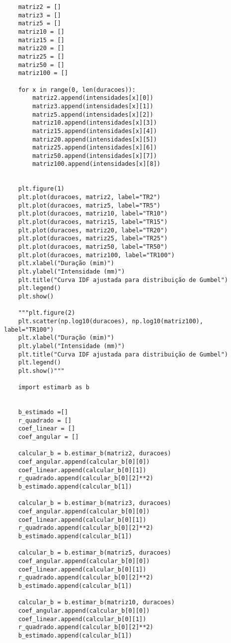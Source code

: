 \begin{apendicesenv}
\begin{verbatim}
    matriz2 = []
    matriz3 = []
    matriz5 = []
    matriz10 = []
    matriz15 = []
    matriz20 = []
    matriz25 = []
    matriz50 = []
    matriz100 = []
    
    for x in range(0, len(duracoes)):
        matriz2.append(intensidades[x][0])
        matriz3.append(intensidades[x][1])
        matriz5.append(intensidades[x][2])
        matriz10.append(intensidades[x][3])
        matriz15.append(intensidades[x][4])
        matriz20.append(intensidades[x][5])
        matriz25.append(intensidades[x][6])
        matriz50.append(intensidades[x][7])
        matriz100.append(intensidades[x][8])
        
    
    plt.figure(1)
    plt.plot(duracoes, matriz2, label="TR2") 
    plt.plot(duracoes, matriz5, label="TR5") 
    plt.plot(duracoes, matriz10, label="TR10") 
    plt.plot(duracoes, matriz15, label="TR15")
    plt.plot(duracoes, matriz20, label="TR20") 
    plt.plot(duracoes, matriz25, label="TR25")
    plt.plot(duracoes, matriz50, label="TR50")
    plt.plot(duracoes, matriz100, label="TR100")
    plt.xlabel("Duração (mim)")
    plt.ylabel("Intensidade (mm)")
    plt.title("Curva IDF ajustada para distribuição de Gumbel")
    plt.legend()
    plt.show()
    
    """plt.figure(2)
    plt.scatter(np.log10(duracoes), np.log10(matriz100), label="TR100")
    plt.xlabel("Duração (mim)")
    plt.ylabel("Intensidade (mm)")
    plt.title("Curva IDF ajustada para distribuição de Gumbel")
    plt.legend()
    plt.show()"""
    
    import estimarb as b
    
    
    b_estimado =[]
    r_quadrado = []
    coef_linear = []
    coef_angular = []
    
    calcular_b = b.estimar_b(matriz2, duracoes)
    coef_angular.append(calcular_b[0][0])
    coef_linear.append(calcular_b[0][1])
    r_quadrado.append(calcular_b[0][2]**2)
    b_estimado.append(calcular_b[1])
    
    calcular_b = b.estimar_b(matriz3, duracoes)
    coef_angular.append(calcular_b[0][0])
    coef_linear.append(calcular_b[0][1])
    r_quadrado.append(calcular_b[0][2]**2)
    b_estimado.append(calcular_b[1])
    
    calcular_b = b.estimar_b(matriz5, duracoes)
    coef_angular.append(calcular_b[0][0])
    coef_linear.append(calcular_b[0][1])
    r_quadrado.append(calcular_b[0][2]**2)
    b_estimado.append(calcular_b[1])
    
    calcular_b = b.estimar_b(matriz10, duracoes)
    coef_angular.append(calcular_b[0][0])
    coef_linear.append(calcular_b[0][1])
    r_quadrado.append(calcular_b[0][2]**2)
    b_estimado.append(calcular_b[1])
    

\end{verbatim}
\end{apendicesenv}
